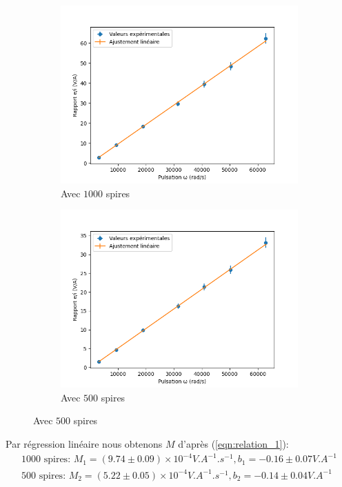 \documentclass[11pt]{article}
\begin{document}
\begin{figure}[h!]
    \centering
    \begin{subfigure}{.5\textwidth}
      \centering
        \includegraphics[width=.95\linewidth]{img/Graph_1000spires.png}
      \caption{Avec $1000$ spires}
      \label{fig:sfig1}
    \end{subfigure}%
    \begin{subfigure}{.5\textwidth}
      \centering
      \includegraphics[width=.95\linewidth]{img/Graph_500spires.png}
      \caption{Avec $500$ spires}
      \label{fig:sfig2}
    \end{subfigure}
\end{figure}

Par régression linéaire nous obtenons $M$ d'après (\ref{eqn:relation_1}):
\begin{align}
    \text{1000 spires: } M_1 = (9.74 \pm 0.09) \times 10^{-4} V.A^{-1}.s^{-1}, b_1 = -0.16 \pm 0.07 V.A^{-1} \\
    \text{500 spires: } M_2 = (5.22 \pm 0.05) \times 10^{-4} V.A^{-1}.s^{-1}, b_2 = -0.14 \pm 0.04 V.A^{-1}
\end{align}
\end{document}
